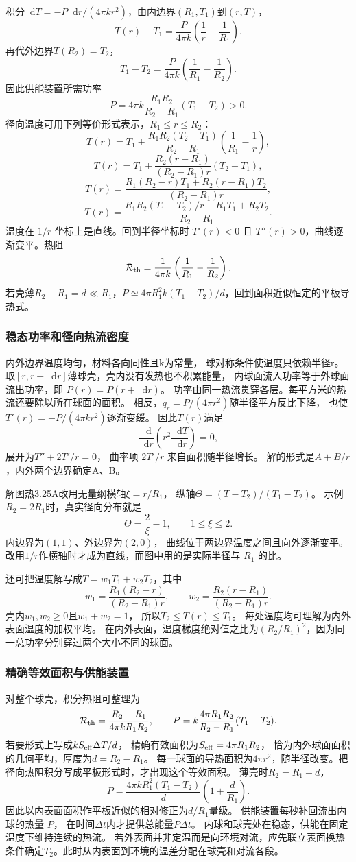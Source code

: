 \documentclass[UTF8,fontset=fandol,a4paper,11pt]{ctexart}
\newcommand{\dd}{\mathop{}\!\mathrm{d}}
\newcommand{\result}[1]{\begin{equation*}\boxed{#1}\end{equation*}}
\begin{document}
积分$\dd T=-P\dd r/(4\pi kr^2)$，由内边界$(R_1,T_1)$到$(r,T)$，
\[T(r)-T_1=\frac P{4\pi k}\left(\frac1r-\frac1{R_1}\right).\]
再代外边界$T(R_2)=T_2$，
\[T_1-T_2=\frac P{4\pi k}\left(\frac1{R_1}-\frac1{R_2}\right).\]
因此供能装置所需功率
\result{P=4\pi k\frac{R_1R_2}{R_2-R_1}(T_1-T_2)>0.}
径向温度可用下列等价形式表示，$R_1\le r\le R_2$：
\[T(r)=T_1+\frac{R_1R_2(T_2-T_1)}{R_2-R_1}
\left(\frac1{R_1}-\frac1r\right),\]
\[T(r)=T_1+\frac{R_2(r-R_1)}{(R_2-R_1)r}(T_2-T_1),\]
\[T(r)=\frac{R_1(R_2-r)T_1+R_2(r-R_1)T_2}{(R_2-R_1)r},\]
\[T(r)=\frac{R_1R_2(T_1-T_2)/r-R_1T_1+R_2T_2}{R_2-R_1}.\]
温度在 $1/r$ 坐标上是直线。回到半径坐标时 $T'(r)<0$ 且 $T''(r)>0$，曲线逐渐变平。热阻
\[\mathcal R_{\rm th}=\frac1{4\pi k}\left(\frac1{R_1}-\frac1{R_2}\right).\]
若壳薄$R_2-R_1=d\ll R_1$，$P\simeq4\pi R_1^2k(T_1-T_2)/d$，回到面积近似恒定的平板导热式。
\subsubsection*{稳态功率和径向热流密度}
内外边界温度均匀，材料各向同性且k为常量，
球对称条件使温度只依赖半径r。
取$[r,r+\dd r]$薄球壳，壳内没有发热也不积累能量，
内球面流入功率等于外球面流出功率，即 $P(r)=P(r+\dd r)$。
功率由同一热流贯穿各层。每平方米的热流还要除以所在球面的面积。
相反，$q_r=P/(4\pi r^2)$随半径平方反比下降，
也使$T'(r)=-P/(4\pi kr^2)$逐渐变缓。
因此$T(r)$满足
\[
\frac{\dd}{\dd r}\left(r^2\frac{\dd T}{\dd r}\right)=0,
\]
展开为$T''+2T'/r=0$，
曲率项 $2T'/r$ 来自面积随半径增长。
解的形式是$A+B/r$，内外两个边界确定A、B。

解图热3.25A改用无量纲横轴$\xi=r/R_1$，
纵轴$\Theta=(T-T_2)/(T_1-T_2)$。
示例$R_2=2R_1$时，真实径向分布就是
\[
\Theta=\frac2\xi-1,\qquad1\le\xi\le2.
\]
内边界为$(1,1)$、外边界为$(2,0)$，
曲线位于两边界温度之间且向外逐渐变平。
改用$1/r$作横轴时才成为直线，而图中用的是实际半径与 $R_1$ 的比。

还可把温度解写成$T=w_1T_1+w_2T_2$，其中
\[
w_1=\frac{R_1(R_2-r)}{(R_2-R_1)r},\qquad
w_2=\frac{R_2(r-R_1)}{(R_2-R_1)r}.
\]
壳内$w_1,w_2\ge0$且$w_1+w_2=1$，
所以$T_2\le T(r)\le T_1$。
每处温度均可理解为内外表面温度的加权平均。
在内外表面，温度梯度绝对值之比为$(R_2/R_1)^2$，因为同一总功率分别穿过两个大小不同的球面。

\subsubsection*{精确等效面积与供能装置}
对整个球壳，积分热阻可整理为
\[
\mathcal R_{\rm th}=\frac{R_2-R_1}{4\pi kR_1R_2},\qquad
P=k\frac{4\pi R_1R_2}{R_2-R_1}(T_1-T_2).
\]
若要形式上写成$kS_{\rm eff}\Delta T/d$，
精确有效面积为$S_{\rm eff}=4\pi R_1R_2$，
恰为内外球面面积的几何平均，厚度为$d=R_2-R_1$。
每一球面的导热面积为$4\pi r^2$，随半径改变。把径向热阻积分写成平板形式时，才出现这个等效面积。
薄壳时$R_2=R_1+d$，
\[
P=\frac{4\pi kR_1^2(T_1-T_2)}d
\left(1+\frac d{R_1}\right).
\]
因此以内表面面积作平板近似的相对修正为$d/R_1$量级。
供能装置每秒补回流出内球的热量 $P$，
在时间$\Delta t$内才提供总能量$P\Delta t$。
内球和球壳处在稳态，供能在固定温度下维持连续的热流。
若外表面并非定温而是向环境对流，应先联立表面换热条件确定$T_2$。此时从内表面到环境的温差分配在球壳和对流各段。
\end{document}
